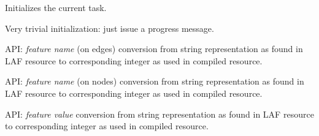\documentclass[letterpaper,10pt,english]{sphinxmanual}
\begin{document}
\begin{fulllineitems}
\begin{fulllineitems}
\end{fulllineitems}


\begin{fulllineitems}
\label{graf/graf:graf.GrafTask.init_task}
Initializes the current task.

Very trivial initialization: just issue a progress message.

\end{fulllineitems}


\begin{fulllineitems}
\label{graf/graf:graf.GrafTask.int_fname_edge}
API: \emph{feature name} (on edges) conversion from string representation as found in LAF resource
to corresponding integer as used in compiled resource.

\end{fulllineitems}


\begin{fulllineitems}
\label{graf/graf:graf.GrafTask.int_fname_node}
API: \emph{feature name} (on nodes) conversion from string representation as found in LAF resource
to corresponding integer as used in compiled resource.

\end{fulllineitems}


\begin{fulllineitems}
\label{graf/graf:graf.GrafTask.int_fval}
API: \emph{feature value} conversion from string representation as found in LAF resource
to corresponding integer as used in compiled resource.

\end{fulllineitems}


\begin{fulllineitems}
\label{graf/graf:graf.GrafTask.loaded}
\end{fulllineitems}


\end{fulllineitems}
\end{document}
